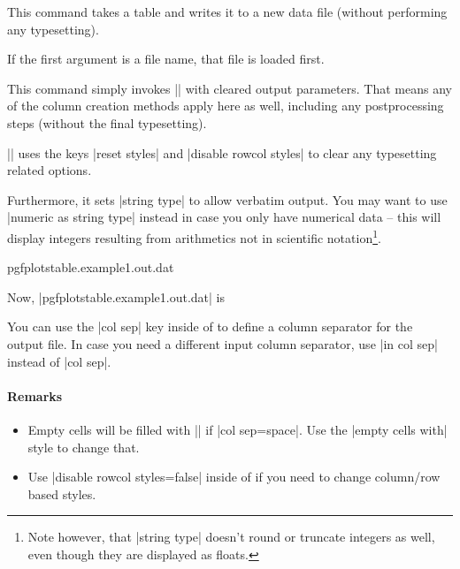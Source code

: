 \begin{command}{\pgfplotstablesave{}}
	This command takes a table and writes it to a new data file (without performing any typesetting).

	If the first argument is a file name, that file is loaded first.

	This command simply invokes |\pgfplotstabletypeset| with cleared output parameters. That means any of the column creation methods apply here as well, including any postprocessing steps (without the final typesetting).

	|\pgfplotstablesave| uses the keys |reset styles| and |disable rowcol styles| to clear any typesetting related options.
	
	Furthermore, it sets |string type| to allow verbatim output. You may want to use |numeric as string type| instead in case you only have numerical data -- this will display integers resulting from arithmetics not in scientific notation\footnote{Note however, that |string type| doesn't round or truncate integers as well, even though they are displayed as floats.}.
\begin{codeexample}[]
	{pgfplotstable.example1.out.dat}
\end{codeexample}
Now, |pgfplotstable.example1.out.dat| is


You can use the |col sep| key inside of  to define a column separator for the output file. In case you need a different input column separator, use |in col sep| instead of |col sep|.

\paragraph{Remarks}
\begin{itemize}
	\item 
Empty cells will be filled with |{}| if |col sep=space|. Use the |empty cells with| style to change that.
	\item  Use |disable rowcol styles=false| inside of  if you need to change column/row based styles.
\end{itemize}
\end{command}

